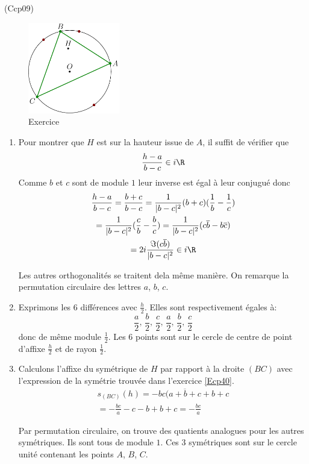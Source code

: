 \begin{tiny}(Ccp09)\end{tiny}
\begin{figure}[h]
 \centering
 \includegraphics[width=4cm]{./Ccp09_1.pdf}
 \caption{Exercice }
 \label{fig:Ccp09_1}
\end{figure}

\begin{enumerate}
 \item Pour montrer que $H$ est sur la hauteur issue de $A$, il suffit de vérifier que 
\begin{displaymath}
 \frac{h -a}{b-c} \in i\R
\end{displaymath}
Comme $b$ et $c$ sont de module $1$ leur inverse est égal à leur conjugué donc
\begin{multline*}
 \frac{h -a}{b-c} = \frac{b+c}{b-c}
 = \frac{1}{|b-c|^2}(b+c)(\frac{1}{b}-\frac{1}{c})\\
 = \frac{1}{|b-c|^2}(\frac{c}{b}-\frac{b}{c})
 = \frac{1}{|b-c|^2}(c\overline{b}-b\overline{c})\\
 = 2i \frac{\Im(c\overline{b})}{|b-c|^2}\in i\R
\end{multline*}

Les autres orthogonalités se traitent dela même manière. On remarque la permutation circulaire des lettres $a$, $b$, $c$.

 \item Exprimons les 6 différences avec $\frac{h}{2}$. Elles sont respectivement égales à:
\begin{displaymath}
 \frac{a}{2},\,\frac{b}{2},\,\frac{c}{2},\,\frac{a}{2},\,\frac{b}{2},\,\frac{c}{2}   
\end{displaymath}
donc de même module $\frac{1}{2}$. Les 6 points sont sur le cercle de centre de point d'affixe $\frac{h}{2}$ et de rayon $\frac{1}{2}$.
 
 
 \item Calculons l'affixe du symétrique de $H$ par rapport à la droite $(BC)$ avec l'expression de la symétrie trouvée dans l'exercice \ref{Ecp40}.
\begin{multline*}
 s_{(BC)}(h) = -bc(\overline{a+b+c}+b+c\\
 = -\frac{bc}{a} -c -b + b + c = -\frac{bc}{a} 
\end{multline*}

Par permutation circulaire, on trouve des quatients analogues pour les autres symétriques. Ils sont tous de module $1$. Ces 3 symétriques sont sur le cercle unité contenant les points $A$, $B$, $C$.
\end{enumerate}
